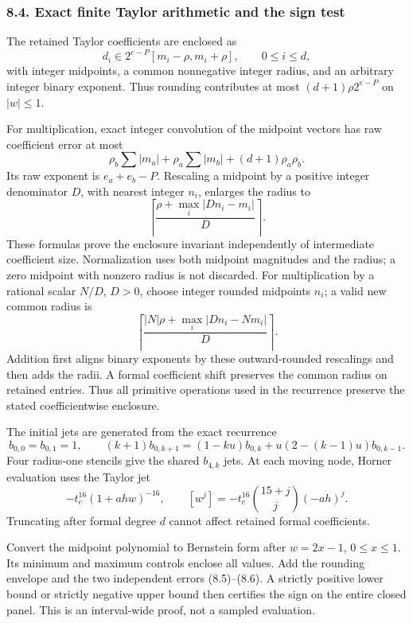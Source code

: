 \documentclass[
  11pt,
]{article}
\begin{document}
\subsubsection{8.4. Exact finite Taylor arithmetic and the sign
test}\label{exact-finite-taylor-arithmetic-and-the-sign-test}

The retained Taylor coefficients are enclosed as \[
 d_i\in2^{e-P}[m_i-\rho,m_i+\rho],\qquad0\le i\le d,
\] with integer midpoints, a common nonnegative integer radius, and an
arbitrary integer binary exponent. Thus rounding contributes at most
\((d+1)\rho2^{e-P}\) on \(|w|\le1\).

For multiplication, exact integer convolution of the midpoint vectors
has raw coefficient error at most \[
 \rho_b\sum|m_a|+\rho_a\sum|m_b|+(d+1)\rho_a\rho_b.
\] Its raw exponent is \(e_a+e_b-P\). Rescaling a midpoint by a positive
integer denominator \(D\), with nearest integer \(n_i\), enlarges the
radius to \[
 \left\lceil\frac{\rho+\max_i|Dn_i-m_i|}{D}\right\rceil.
\] These formulas prove the enclosure invariant independently of
intermediate coefficient size. Normalization uses both midpoint
magnitudes and the radius; a zero midpoint with nonzero radius is not
discarded. For multiplication by a rational scalar \(N/D\), \(D>0\),
choose integer rounded midpoints \(n_i\); a valid new common radius is
\[
 \left\lceil\frac{|N|\rho+\max_i|Dn_i-Nm_i|}{D}\right\rceil.
\] Addition first aligns binary exponents by these outward-rounded
rescalings and then adds the radii. A formal coefficient shift preserves
the common radius on retained entries. Thus all primitive operations
used in the recurrence preserve the stated coefficientwise enclosure.

The initial jets are generated from the exact recurrence \[
 b_{0,0}=b_{0,1}=1,\qquad
 (k+1)b_{0,k+1}=(1-ku)b_{0,k}+u(2-(k-1)u)b_{0,k-1}.           \tag{8.7}
\] Four radius-one stencils give the shared \(b_{4,k}\) jets. At each
moving node, Horner evaluation uses the Taylor jet \[
 -t_c^{16}(1+ahw)^{-16},\qquad
 [w^j]=-t_c^{16}\binom{15+j}{j}(-ah)^j.
\] Truncating after formal degree \(d\) cannot affect retained formal
coefficients.

Convert the midpoint polynomial to Bernstein form after \(w=2x-1\),
\(0\le x\le1\). Its minimum and maximum controls enclose all values. Add
the rounding envelope and the two independent errors (8.5)--(8.6). A
strictly positive lower bound or strictly negative upper bound then
certifies the sign on the entire closed panel. This is an interval-wide
proof, not a sampled evaluation.
\end{document}
